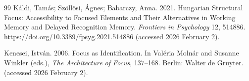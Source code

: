 \documentclass[ruler]{CUP-JNL-LIN}%
\begin{document}
\begin{Backmatter}
\begin{thebibliography}{99}
{Káldi, Tamás; Szöllösi, Ágnes; Babarczy, Anna}. 2021. Hungarian Structural Focus: Accessibility to Focused Elements and Their Alternatives in Working Memory and Delayed Recognition Memory. \textit{Frontiers in Psychology} 12, 514886. \url{https://doi.org/10.3389/fpsyg.2021.514886}  (accessed 2026 February 2).




{Kenesei, István}. 2006. Focus as Identification. In Valéria Molnár and Susanne Winkler (eds.), \textit{The Architecture of Focus}, 137--168. Berlin: Walter de Gruyter. (accessed 2026 February 2).




\end{thebibliography}
\end{Backmatter}
\end{document}
